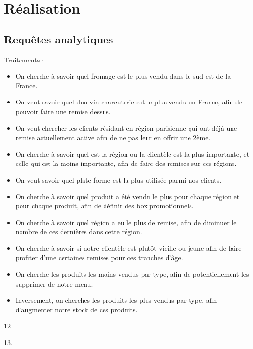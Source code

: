 \section{Réalisation}

\subsection{Requêtes analytiques}

Traitements : 
\begin{itemize}
    \item On cherche à savoir quel fromage est le plus vendu dans le sud est de la France.
    \item On veut savoir quel duo vin-charcuterie est le plus vendu en France, afin de pouvoir faire une remise dessus.
    \item On veut chercher les clients résidant en région parisienne qui ont déjà une remise actuellement active afin de ne pas leur en offrir une 2ème.
    \item On cherche à savoir quel est la région ou la clientèle est la plus importante, et celle qui est la moins importante, afin de faire des remises sur ces régions.
    \item On veut savoir quel plate-forme est la plus utilisée parmi nos clients.
    \item On cherche à savoir quel produit a été vendu le plus pour chaque région et pour chaque produit, afin de définir des box promotionnels.
    \item On cherche à savoir quel région a eu le plus de remise, afin de diminuer le nombre de ces dernières dans cette région.
    \item On cherche à savoir si notre clientèle est plutôt vieille ou jeune afin de faire profiter d'une certaines remises pour ces tranches d'âge.
    \item On cherche les produits les moins vendus par type, afin de potentiellement les supprimer de notre menu.
    \item Inversement, on cherches les produits les plus vendus par type, afin d'augmenter notre stock de ces produits.
\end{itemize}

12.

13.
